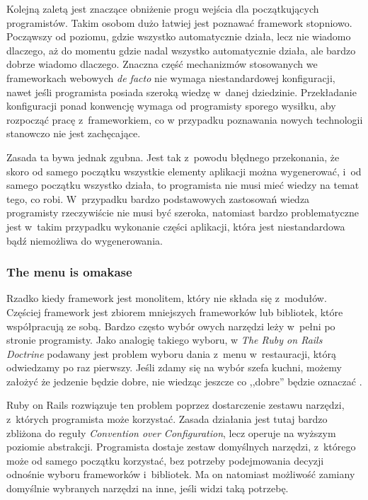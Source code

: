 Kolejną zaletą jest znaczące obniżenie progu wejścia dla początkujących programistów. Takim osobom dużo łatwiej jest poznawać framework stopniowo. Począwszy od poziomu, gdzie wszystko automatycznie działa, lecz nie wiadomo dlaczego, aż do momentu gdzie nadal wszystko automatycznie działa, ale bardzo dobrze wiadomo dlaczego. Znaczna część mechanizmów stosowanych we frameworkach webowych \emph{de facto} nie wymaga niestandardowej konfiguracji, nawet jeśli programista posiada szeroką wiedzę w~danej dziedzinie. Przekładanie konfiguracji ponad konwencję wymaga od programisty sporego wysiłku, aby rozpocząć pracę z~frameworkiem, co w przypadku poznawania nowych technologii stanowczo nie jest zachęcające.

Zasada ta bywa jednak zgubna. Jest tak z~powodu błędnego przekonania, że skoro od samego początku wszystkie elementy aplikacji można wygenerować, i~od samego początku wszystko działa, to programista nie musi mieć wiedzy na temat tego, co robi. W~przypadku bardzo podstawowych zastosowań wiedza programisty rzeczywiście nie musi być szeroka, natomiast bardzo problematyczne jest w~takim przypadku wykonanie części aplikacji, która jest niestandardowa bądź niemożliwa do wygenerowania.

\subsubsection{The menu is omakase}
Rzadko kiedy framework jest monolitem, który nie składa się z~modułów. Częściej framework jest zbiorem mniejszych frameworków lub bibliotek, które współpracują ze sobą. Bardzo często wybór owych narzędzi leży w~pełni po stronie programisty. Jako analogię takiego wyboru, w \emph{The Ruby on Rails Doctrine} podawany jest problem wyboru dania z~menu w~restauracji, którą odwiedzamy po raz pierwszy. Jeśli zdamy się na wybór szefa kuchni, możemy założyć że jedzenie będzie dobre, nie wiedząc jeszcze co ,,dobre'' będzie oznaczać \cite{rails_doctrine}.

Ruby on Rails rozwiązuje ten problem poprzez dostarczenie zestawu narzędzi, z~których programista może korzystać. Zasada działania jest tutaj bardzo zbliżona do reguły \emph{Convention over Configuration}, lecz operuje na wyższym poziomie abstrakcji. Programista dostaje zestaw domyślnych narzędzi, z~którego może od samego początku korzystać, bez potrzeby podejmowania decyzji odnośnie wyboru frameworków i~bibliotek. Ma on natomiast możliwość zamiany domyślnie wybranych narzędzi na inne, jeśli widzi taką potrzebę.

